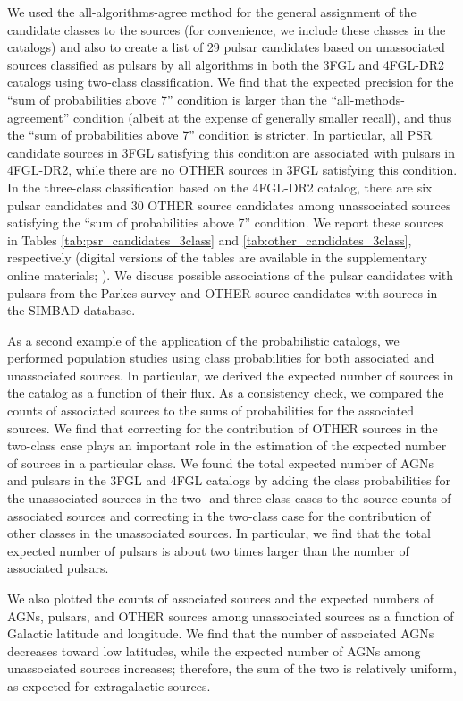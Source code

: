 \documentclass[referee]{aa} %
\begin{document}
We used the all-algorithms-agree method for the general assignment of the candidate classes to the sources (for convenience, we include these classes in the catalogs) and also to create a list of 29 pulsar candidates based on unassociated sources classified as pulsars by all algorithms in both the 3FGL and 4FGL-DR2 catalogs using two-class classification.
We find that the expected precision for the ``sum of probabilities above 7'' condition is larger than the ``all-methods-agreement'' condition (albeit at the expense of generally smaller recall), and thus the ``sum of probabilities above 7'' condition is stricter.
In particular, all PSR candidate sources in 3FGL satisfying this condition are associated with pulsars in 4FGL-DR2, while there are no OTHER sources in 3FGL satisfying this condition. In the three-class classification based on the 4FGL-DR2 catalog, there are six pulsar candidates and 30 OTHER source candidates among unassociated sources satisfying  the ``sum of probabilities above 7'' condition. 
We report these sources in Tables \ref{tab:psr_candidates_3class} and \ref{tab:other_candidates_3class}, respectively (digital versions of the tables are available in the supplementary online materials; \citealt{SOM_material}). We discuss possible associations of the pulsar candidates with pulsars from the Parkes survey \citep{Camilo2015} and OTHER source candidates with sources in the SIMBAD database.

As a second example of the application of the probabilistic catalogs, we performed population studies using class probabilities for both associated and unassociated sources.
In particular, we derived the expected number of sources in the catalog as a function of their flux.
As a consistency check, we compared the counts of associated sources to the sums of probabilities for the associated sources.
We find that correcting for the contribution of OTHER sources in the two-class case plays an important role in the estimation of the expected number of sources in a particular class.
We found the total expected number of AGNs and pulsars in the 3FGL and 4FGL catalogs by adding the class probabilities for the unassociated sources in the two- and three-class cases to the source counts of associated sources and correcting in the two-class case for the contribution of other classes in the unassociated sources.
In particular, we find that the total expected number of pulsars is about two times larger than the number of associated pulsars.

We also plotted the counts of associated sources and the expected numbers of AGNs, pulsars, and OTHER sources among unassociated sources
as a function of Galactic latitude and longitude.
We find that the number of associated AGNs decreases toward low latitudes, while the expected number of AGNs among unassociated sources increases; therefore, the sum of the two is relatively uniform, as expected for extragalactic sources.
\end{document}
